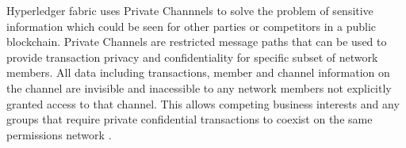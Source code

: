 Hyperledger fabric uses Private Channnels to solve the problem of sensitive information which could be seen for other parties or competitors in a public blockchain. Private Channels are restricted message paths that can be used to provide transaction privacy and confidentiality for specific subset of network members. All data including transactions, member and channel information on the channel are invisible and inacessible to any network members not explicitly granted access to that channel. This allows competing business interests and any groups that require private confidential transactions to coexist on the same permissions network \cite{brabbani2017hashing}.